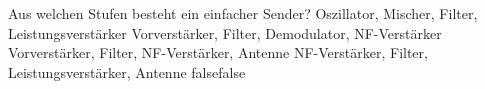     {Aus welchen Stufen besteht ein einfacher Sender?}
    {Oszillator, Mischer, Filter, Leistungsverstärker}
    {Vorverstärker, Filter, Demodulator, NF-Verstärker}
    {Vorverstärker, Filter, NF-Verstärker, Antenne}
    {NF-Verstärker, Filter, Leistungsverstärker, Antenne}
    {false}{false}